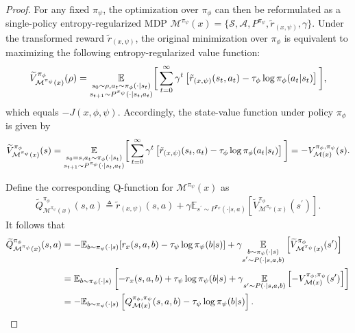 \documentclass{article}
\theoremstyle{plain}
\theoremstyle{definition}
\theoremstyle{remark}
\def\E{\mathbb E}
\def\cM{\mathcal M}
\def\bydef{\triangleq}
\begin{document}
\begin{proof}
For any fixed $\pi_\psi$, the optimization over $\pi_\phi$ can then be
reformulated as a single-policy entropy-regularized MDP
$
\mathcal{M}^{\pi_\psi}(x)
=
\{\mathcal{S}, \mathcal{A}, P^{\pi_\psi},
\tilde{r}_{(x,\psi)}, \gamma\}$. Under the transformed reward $\tilde{r}_{(x,\psi)}$, the original
minimization over $\pi_\phi$ is equivalent to maximizing the following
entropy-regularized value function:
\begin{align}
        \widetilde{V}^{\pi_\phi}_{\cM^{\pi_\psi}(x)}(\rho) = \underset{\substack{s_0 \sim \rho, a_t \sim \pi_\phi(\cdot|s_t) \\s_{t+1} \sim P^{\pi_\psi}(\cdot|s_t,a_t)}}{\mathbb{E}} \bigg[
            \sum_{t=0}^{\infty} \gamma^t \left[
                \tilde{r}_{(x,\psi)}(s_t,a_t) - \tau_\phi \log \pi_\phi(a_t|s_t)
            \right]   
        \bigg] , \notag
\end{align}
which equals $-J(x,\phi,\psi)$. Accordingly, the state-value function under
policy $\pi_\phi$ is given by
\begin{align}
        \widetilde{V}^{\pi_\phi}_{\cM^{\pi_\psi}(x)}(s) = \underset{\substack{s_0 = s, a_t \sim \pi_\phi(\cdot|s_t) \\s_{t+1} \sim P^{\pi_\psi}(\cdot|s_t,a_t)}}{\mathbb{E}} \bigg[
            \sum_{t=0}^{\infty} \gamma^t \left[
                \tilde{r}_{(x,\psi)}(s_t,a_t) - \tau_\phi \log \pi_\phi(a_t|s_t)
            \right]   
        \bigg] = - V^{\pi_\phi,\pi_\psi}_{\cM(x)}(s) . \notag
    \end{align}

    Define the corresponding Q-function for $\mathcal{M}^{\pi_\psi}(x)$ as
    \begin{align}
        \widetilde{Q}^{\pi_\phi}_{\cM^{\pi_\psi}(x)}(s,a) \bydef \tilde{r}_{(x,\psi)}(s,a) + \gamma \E_{s^\prime \sim P^{\pi_\psi}(\cdot|s,a)} \left[ \widetilde{V}^{\pi_\phi}_{\cM^{\pi_\psi}(x)}(s^\prime) \right]. 
    \end{align}
    It follows that
    \begin{align}
         \widetilde{Q}^{\pi_\phi}_{\cM^{\pi_\psi}(x)}(s,a) & = - \E_{b \sim \pi_\psi(\cdot|s)}[r_x(s,a,b) - \tau_\psi \log \pi_\psi(b|s)] + \gamma \underset{\substack{b \sim \pi_\psi(\cdot|s) \\s^\prime \sim P(\cdot|s,a,b)}}{\E} \left[ \widetilde{V}^{\pi_\phi}_{\cM^{\pi_\psi}(x)}(s^\prime) \right] \notag\\ 
         & = \E_{b \sim \pi_\psi(\cdot|s)} \left[ - r_x(s,a,b) + \tau_\psi \log \pi_\psi(b|s) + \gamma \underset{s^\prime \sim P(\cdot|s,a,b)}{\E} \left[ - V^{\pi_\phi,\pi_\psi}_{\cM(x)}(s^\prime) \right] \right] \notag\\ 
         & = - \E_{b \sim \pi_\psi(\cdot|s)} \left[Q^{\pi_\phi,\pi_\psi}_{\cM(x)}(s,a,b)- \tau_\psi \log \pi_\psi(b|s) \right].
    \end{align}


\end{proof}
\end{document}
